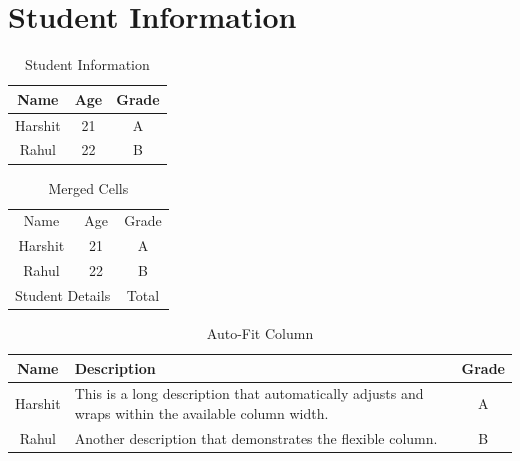 \documentclass{article}
\begin{document}
\section*{Student Information}

\begin{table}[h]
\centering
\caption{Student Information}

\begin{tabular}{|c|c|c|}
\hline
Name & Age & Grade \\
\hline
Harshit & 21 & A \\
\hline
Rahul & 22 & B \\
\hline
\end{tabular}

\end{table}


\begin{table}[h]
\centering
\caption{Merged Cells}

\begin{tabular}{|c|c|c|}
\hline
\multirow{2}{*}{Name} & \multirow{2}{*}{Age} & \multirow{2}{*}{Grade} \\
& & \\
\hline
Harshit & 21 & A \\
\hline
Rahul & 22 & B \\
\hline
\multicolumn{2}{c}{Student Details} & Total \\
\hline
\end{tabular}

\end{table}


\begin{table}[h]
\centering
\caption{Auto-Fit Column}

\begin{tabularx}{\textwidth}{|c|X|c|}
\hline
Name & Description & Grade \\
\hline
Harshit & This is a long description that automatically adjusts and wraps within the available column width. & A \\
\hline
Rahul & Another description that demonstrates the flexible column. & B \\
\hline
\end{tabularx}

\end{table}
\end{document}
